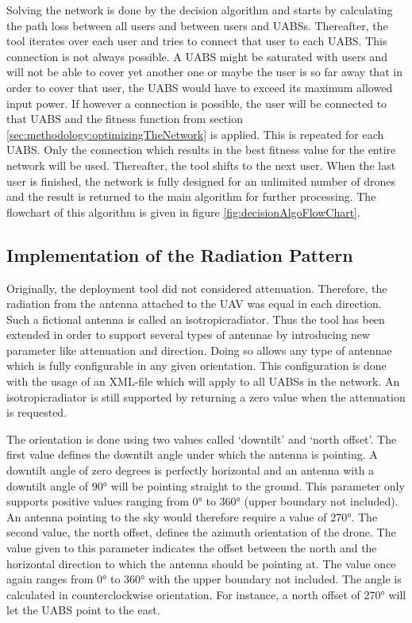 \begin{minipage}{0.4\textwidth}\vspace{-120pt}%
Solving the network is done by the decision algorithm and starts by calculating the path loss between all users and between users and \gls{UABS}s.
Thereafter, the tool iterates over each user and tries to connect that user to each \gls{UABS}. This connection is not always possible. A \gls{UABS} might be saturated with users and 
will not be able to cover yet another one or maybe the user is so far away that in order to cover that user, the \gls{UABS} would have to exceed its maximum allowed input power.
If however a connection is possible, the user will be connected to that \gls{UABS} and the fitness function from section \ref{sec:methodology:optimizingTheNetwork} is applied. 
This is repeated for each \gls{UABS}. Only the connection which results in the best fitness value for the entire network will be used. Thereafter, the tool shifts to the next user. 
When the last user is finished, the network is fully designed for an unlimited number of drones and the result is returned to the main algorithm for further processing.
The flowchart of this algorithm is given in figure \ref{fig:decisionAlgoFlowChart}.
\end{minipage}

\FloatBarrier
\subsection{Implementation of the Radiation Pattern}
\label{subsec:implementationradpat}

Originally, the deployment tool  did not considered attenuation. 
Therefore, the radiation from the antenna attached to the \gls{UAV} 
was equal in each direction. Such a fictional antenna is called an \gls{isotropicradiator}. 
Thus the tool has been extended in order 
to support several types of antennae by introducing new parameter like attenuation and direction.
Doing so allows any type of antennae which is fully configurable in any given orientation.
This configuration is done with the usage of an XML-file which will apply to all \gls{UABS}s in the network.
An \gls{isotropicradiator} is still supported by returning 
a zero value when the attenuation is requested.

The orientation is done using two values called `downtilt' and `north offset'. The first value
defines the downtilt angle under which the antenna is pointing. A downtilt angle of zero degrees is perfectly horizontal and 
an antenna with a downtilt angle of \ang{90} will be pointing straight to the ground.
This parameter only supports positive values ranging from \ang{0} to \ang{360} (upper boundary not included). An antenna pointing to the sky would therefore require a value of \ang{270}.
The second value, the north offset, defines the azimuth orientation of the drone. The value given to this parameter indicates the offset between the north
and the horizontal direction to which the antenna should be pointing at. The value once again ranges from \ang{0} to \ang{360} with the upper boundary not included. The
angle is calculated in counterclockwise orientation. For instance, a north offset of \ang{270} will let the \gls{UABS} point to the east.  

